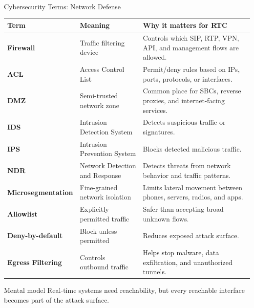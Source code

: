 \documentclass[aspectratio=169]{beamer}
\begin{document}
\begin{frame}{Cybersecurity Terms: Network Defense}
\tiny
\begin{tabular}{p{2.2cm} p{3.5cm} p{6.5cm}}
\toprule
\textbf{Term} & \textbf{Meaning} & \textbf{Why it matters for RTC} \\
\midrule
\textbf{Firewall} & Traffic filtering device & Controls which SIP, RTP, VPN, API, and management flows are allowed. \\
\textbf{ACL} & Access Control List & Permit/deny rules based on IPs, ports, protocols, or interfaces. \\
\textbf{DMZ} & Semi-trusted network zone & Common place for SBCs, reverse proxies, and internet-facing services. \\
\textbf{IDS} & Intrusion Detection System & Detects suspicious traffic or signatures. \\
\textbf{IPS} & Intrusion Prevention System & Blocks detected malicious traffic. \\
\textbf{NDR} & Network Detection and Response & Detects threats from network behavior and traffic patterns. \\
\textbf{Microsegmentation} & Fine-grained network isolation & Limits lateral movement between phones, servers, radios, and apps. \\
\textbf{Allowlist} & Explicitly permitted traffic & Safer than accepting broad unknown flows. \\
\textbf{Deny-by-default} & Block unless permitted & Reduces exposed attack surface. \\
\textbf{Egress Filtering} & Controls outbound traffic & Helps stop malware, data exfiltration, and unauthorized tunnels. \\
\bottomrule
\end{tabular}

\vspace{0.15cm}
\begin{block}{Mental model}
Real-time systems need reachability, but every reachable interface becomes part of the attack surface.
\end{block}
\end{frame}
\end{document}
